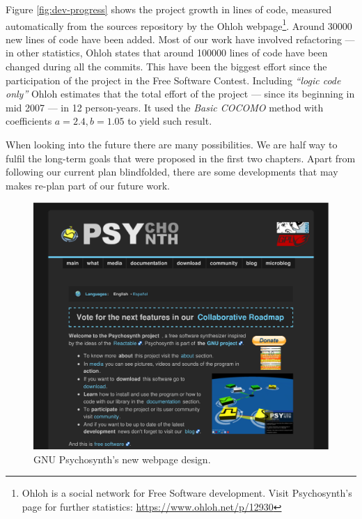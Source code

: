 Figure \ref{fig:dev-progress} shows the project growth in lines of
code, measured automatically from the sources repository by the Ohloh
webpage\footnote{Ohloh is a social network for Free Software
  development. Visit Psychosynth's page for further statistics:
  \url{https://www.ohloh.net/p/12930}}. Around 30000 new lines of code
have been added. Most of our work have involved refactoring --- in
other statistics, Ohloh states that around 100000 lines of code have
been changed during all the commits. This have been the biggest effort
since the participation of the project in the Free Software
Contest. Including \emph{``logic code only''} Ohloh estimates that the
total effort of the project --- since its beginning in mid 2007 --- in
12 person-years. It used the \emph{Basic COCOMO} \cite{bohem00cocomo}
method with coefficients $a = 2.4, b = 1.05$ to yield such result.

When looking into the future there are many possibilities. We are half
way to fulfil the long-term goals that were proposed in the first two
chapters. Apart from following our current plan blindfolded, there are
some developments that may makes re-plan part of our future work.

\begin{figure}[h!]
  \centering
  \includegraphics[width=\textwidth]{pic/webpage.pdf}
  \caption{GNU Psychosynth's new webpage design.}
  \label{fig:webpage}
\end{figure}

